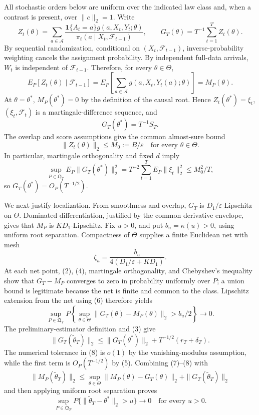 All stochastic orders below are uniform over the indicated law class and, when a contrast is present, over \(\|c\|_2=1\). Write
\[
 Z_t(\theta)=\sum_{a\in\mathcal A}
 \frac{\mathbf1\{A_t=a\}g(a,X_t,Y_t;\theta)}
 {\pi_t(a\mid X_t,\mathcal F_{t-1})},
 \qquad G_T(\theta)=T^{-1}\sum_{t=1}^T Z_t(\theta).
\tag{1}
\]
By sequential randomization, conditional on \((X_t,\mathcal F_{t-1})\), inverse-probability weighting cancels the assignment probability. By independent full-data arrivals, \(W_t\) is independent of \(\mathcal F_{t-1}\). Therefore, for every \(\theta\in\Theta\),
\[
 E_P[Z_t(\theta)\mid\mathcal F_{t-1}]
 =E_P\!\left[\sum_{a\in\mathcal A}g(a,X_t,Y_t(a);\theta)\right]
 =M_P(\theta).
\tag{2}
\]
At \(\theta=\theta^*\), \(M_P(\theta^*)=0\) by the definition of the causal root. Hence \(Z_t(\theta^*)=\xi_t\), \((\xi_t,\mathcal F_t)\) is a martingale-difference sequence, and
\[
 G_T(\theta^*)=T^{-1}S_T.
\tag{3}
\]
The overlap and score assumptions give the common almost-sure bound
\[
 \|Z_t(\theta)\|_2\le M_0:=B/\varepsilon
 \quad\text{for every }\theta\in\Theta.
\tag{4}
\]
In particular, martingale orthogonality and fixed \(d\) imply
\[
 \sup_{P\in\mathfrak Q_T}E_P\|G_T(\theta^*)\|_2^2
 =T^{-2}\sum_{t=1}^TE_P\|\xi_t\|_2^2
 \le M_0^2/T,
\tag{5}
\]
so \(G_T(\theta^*)=O_P(T^{-1/2})\).

We next justify localization. From smoothness and overlap, \(G_T\) is \(D_1/\varepsilon\)-Lipschitz on \(\Theta\). Dominated differentiation, justified by the common derivative envelope, gives that \(M_P\) is \(KD_1\)-Lipschitz. Fix \(u>0\), and put \(b_u=\kappa(u)>0\), using uniform root separation. Compactness of \(\Theta\) supplies a finite Euclidean net with mesh
\[
 \zeta_u=\frac{b_u}{4(D_1/\varepsilon+KD_1)}.
\tag{6}
\]
At each net point, (2), (4), martingale orthogonality, and Chebyshev's inequality show that \(G_T-M_P\) converges to zero in probability uniformly over \(P\); a union bound is legitimate because the net is finite and common to the class. Lipschitz extension from the net using (6) therefore yields
\[
 \sup_{P\in\mathfrak Q_T}P\!\left\{
 \sup_{\theta\in\Theta}\|G_T(\theta)-M_P(\theta)\|_2>b_u/2
 \right\}\longrightarrow0.
\tag{7}
\]
The preliminary-estimator definition and (3) give
\[
 \|G_T(\widetilde\theta_T)\|_2
 \le \|G_T(\theta^*)\|_2+T^{-1/2}(r_T+\delta_T).
\tag{8}
\]
The numerical tolerance in (8) is \(o(1)\) by the vanishing-modulus assumption, while the first term is \(O_P(T^{-1/2})\) by (5). Combining (7)--(8) with
\[
 \|M_P(\widetilde\theta_T)\|_2
 \le\sup_{\theta\in\Theta}\|M_P(\theta)-G_T(\theta)\|_2
     +\|G_T(\widetilde\theta_T)\|_2
\tag{9}
\]
and then applying uniform root separation proves
\[
 \sup_{P\in\mathfrak Q_T}P\{\|\widetilde\theta_T-\theta^*\|_2>u\}
 \longrightarrow0
 \quad\text{for every }u>0.
\tag{10}
\]

